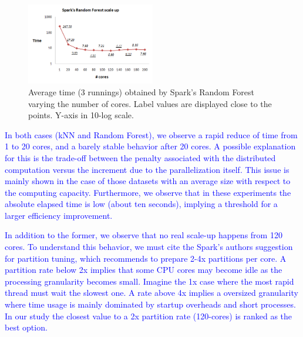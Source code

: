 \documentclass[3p,review]{elsarticle}
\begin{document}
	\begin{figure}[!htp]
		\centering
		\includegraphics[width=0.5\textwidth]{rf-spark}
		\caption{Average time (3 runnings) obtained by Spark's Random Forest varying the number of cores. Label values are displayed close to the points. Y-axis in 10-log scale.}
		\label{fig:rf-spark}
	\end{figure}
	
	
	\textcolor{blue}{In both cases (kNN and Random Forest), we observe a rapid reduce of time from 1 to 20 cores, and a barely stable behavior after 20 cores. A possible explanation for this is the trade-off between the penalty associated with the distributed computation versus the increment due to the parallelization itself. This issue is mainly shown in the case of those datasets with an average size with respect to the computing capacity. Furthermore, we observe that in these experiments the absolute elapsed time is low (about ten seconds), implying a threshold for a larger efficiency improvement.}
	
	
	\textcolor{blue}{In addition to the former, we observe that no real scale-up happens from 120 cores. To understand this behavior, we must cite the Spark's authors suggestion~\cite{mllibguide} for partition tuning, which recommends to prepare 2-4x partitions per core. A partition rate below 2x implies that some CPU cores may become idle as the processing granularity becomes small. Imagine the 1x case where the most rapid thread must wait the slowest one. A rate above 4x implies a oversized granularity where time usage is mainly dominated by startup overheads and short processes. In our study the closest value to a 2x partition rate (120-cores) is ranked as the best option. }
	
\end{document}
